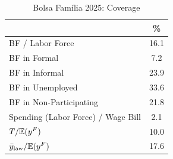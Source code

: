 \begin{table}[htbp]
\centering
\caption{Bolsa Fam\'ilia 2025: Coverage}
\label{tab:bf_coverage}
\small
\begin{tabular}{lc}
\toprule
 & \% \\
\midrule
BF / Labor Force & 16.1 \\
BF in Formal & 7.2 \\
BF in Informal & 23.9 \\
BF in Unemployed & 33.6 \\
BF in Non-Participating & 21.8 \\
Spending (Labor Force) / Wage Bill & 2.1 \\
$T / \mathbb{E}(y^F)$ & 10.0 \\
$\bar y_\text{law} / \mathbb{E}(y^F)$ & 17.6 \\
\bottomrule
\end{tabular}
\end{table}
